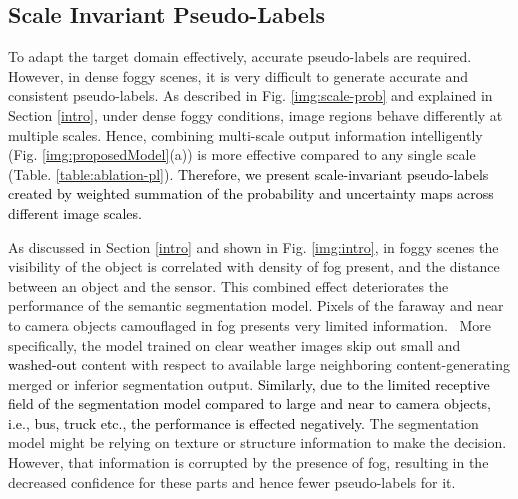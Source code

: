 \documentclass[final,5p,times,twocolumn]{elsarticle}
\begin{document}
\subsection{Scale Invariant Pseudo-Labels}
\label{sec:sisc}
To adapt the target domain effectively, accurate pseudo-labels are required. 
However, in dense foggy scenes, it is very difficult to generate accurate and consistent pseudo-labels. 
As described in Fig. \ref{img:scale-prob} and explained in Section \ref{intro}, under dense foggy conditions, image regions behave differently at multiple scales. 
Hence, combining multi-scale output information intelligently (Fig. \ref{img:proposedModel}(a)) is more effective compared to any single scale (Table. \ref{table:ablation-pl}). 
\textcolor{black}{Therefore, we present scale-invariant pseudo-labels created by weighted summation of the probability and uncertainty maps across different image scales.}











As discussed in Section \ref{intro} and shown in Fig. \ref{img:intro}, in foggy scenes the visibility of the object is correlated with density of fog present, and the distance between an object and the sensor. 
This combined effect deteriorates the performance of the semantic segmentation model. 
Pixels of the faraway and near to camera objects camouflaged in fog presents very limited information. 
\
More specifically, the model trained on clear weather images skip out small and \textcolor{black}{washed-out} content with respect to available large neighboring content-generating merged or inferior segmentation output. 
\textcolor{black}{Similarly, due to the limited receptive field of the segmentation model 
compared to large and near to camera objects, i.e., bus, truck etc., the performance is effected negatively.}
The segmentation model might be relying on texture or structure information to make the decision. However, that information is corrupted by the presence of fog, resulting in the decreased confidence for these parts and hence fewer pseudo-labels for it.
\end{document}
